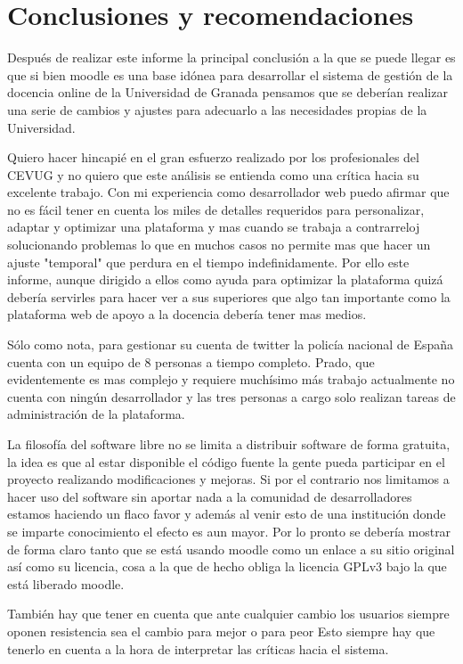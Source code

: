 \chapter{Conclusiones y recomendaciones}

Después de realizar este informe la principal conclusión a la que se puede llegar es que si bien moodle es una base idónea para desarrollar el sistema de gestión de la docencia online de la Universidad de Granada pensamos que se deberían realizar una serie de cambios y ajustes para adecuarlo a las necesidades propias de la Universidad.

\bigskip
Quiero hacer hincapié en el gran esfuerzo realizado por los profesionales del CEVUG y no quiero que este análisis se entienda como una crítica hacia su excelente trabajo. Con mi experiencia como desarrollador web puedo afirmar que no es fácil tener en cuenta los miles de detalles requeridos para personalizar, adaptar y optimizar una plataforma y mas cuando se trabaja a contrarreloj solucionando problemas lo que en muchos casos no permite mas que hacer un ajuste "temporal" que perdura en el tiempo indefinidamente. Por ello este informe, aunque dirigido a ellos como ayuda para optimizar la plataforma quizá debería servirles para hacer ver a sus superiores que algo tan importante como la plataforma web de apoyo a la docencia debería tener mas medios.

\bigskip
Sólo como nota, para gestionar su cuenta de twitter la policía nacional de España cuenta con un equipo de 8 personas a tiempo completo. Prado, que evidentemente es mas complejo y requiere muchísimo más trabajo actualmente no cuenta con ningún desarrollador y las tres personas a cargo solo realizan tareas de administración de la plataforma.

\bigskip

La filosofía del software libre no se limita a distribuir software de forma gratuita, la idea es que al estar disponible el código fuente la gente pueda participar en el proyecto realizando modificaciones y mejoras. Si por el contrario nos limitamos a hacer uso del software sin aportar nada a la comunidad de desarrolladores estamos haciendo un flaco favor y además al venir esto de una institución donde se imparte conocimiento el efecto es aun mayor. Por lo pronto se debería mostrar de forma claro tanto que se está usando moodle como un enlace a su sitio original así como su licencia, cosa a la que de hecho obliga la licencia GPLv3 bajo la que está liberado moodle.

\bigskip
También hay que tener en cuenta que ante cualquier cambio los usuarios siempre oponen resistencia sea el cambio para mejor o para peor Esto siempre hay que tenerlo en cuenta a la hora de interpretar las críticas hacia el sistema.

